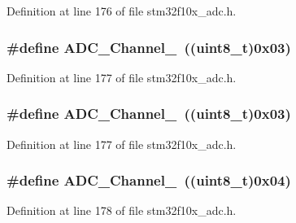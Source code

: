 Definition at line 176 of file stm32f10x\+\_\+adc.\+h.

\subsubsection[{\texorpdfstring{A\+D\+C\+\_\+\+Channel\+\_\+3}{ADC_Channel_3}}]{\setlength{\rightskip}{0pt plus 5cm}\#define A\+D\+C\+\_\+\+Channel\+\_~(({\bf uint8\+\_\+t})0x03)}\hypertarget{group___a_d_c__channels_ga9f93cbacd030f1c79f96f8889b0cdee6}{}\label{group___a_d_c__channels_ga9f93cbacd030f1c79f96f8889b0cdee6}


Definition at line 177 of file stm32f10x\+\_\+adc.\+h.

\subsubsection[{\texorpdfstring{A\+D\+C\+\_\+\+Channel\+\_\+3}{ADC_Channel_3}}]{\setlength{\rightskip}{0pt plus 5cm}\#define A\+D\+C\+\_\+\+Channel\+\_~(({\bf uint8\+\_\+t})0x03)}\hypertarget{group___a_d_c__channels_ga9f93cbacd030f1c79f96f8889b0cdee6}{}\label{group___a_d_c__channels_ga9f93cbacd030f1c79f96f8889b0cdee6}


Definition at line 177 of file stm32f10x\+\_\+adc.\+h.

\subsubsection[{\texorpdfstring{A\+D\+C\+\_\+\+Channel\+\_\+4}{ADC_Channel_4}}]{\setlength{\rightskip}{0pt plus 5cm}\#define A\+D\+C\+\_\+\+Channel\+\_~(({\bf uint8\+\_\+t})0x04)}\hypertarget{group___a_d_c__channels_gafc7218417f729659dd8f06185cc2eafa}{}\label{group___a_d_c__channels_gafc7218417f729659dd8f06185cc2eafa}


Definition at line 178 of file stm32f10x\+\_\+adc.\+h.

